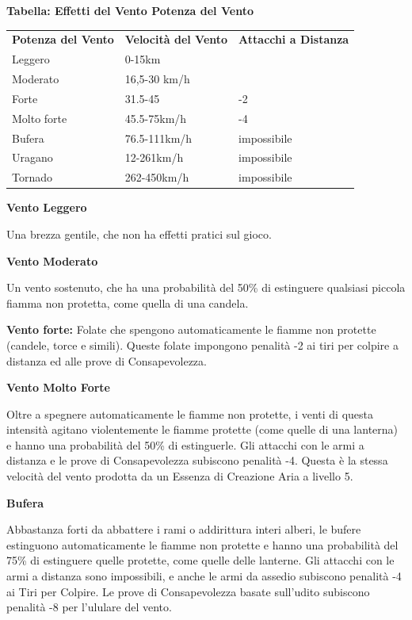 \documentclass[a4paper,11pt,twoside,openany]{book}
\begin{document}
\textbf{Tabella: Effetti del Vento Potenza del Vento}

\medskip

\begin{tabular}{lll}
	\toprule
	\textbf{Potenza del Vento} & \textbf{Velocità del Vento}   & \textbf{Attacchi a Distanza} \\
	Leggero     & 0-15km \\
	Moderato    & 16,5-30 km/h  \\
	Forte       & 31.5-45        & -2 \\
	Molto forte & 45.5-75km/h    & -4 \\
	Bufera      & 76.5-111km/h   & impossibile  \\
	Uragano     & 12-261km/h     & impossibile \\
	Tornado     & 262-450km/h    & impossibile\\
\end{tabular}

\bigskip

\textbf{Vento Leggero}

Una brezza gentile, che non ha effetti pratici sul gioco.

\textbf{Vento Moderato}

Un vento sostenuto, che ha una probabilità del 50\% di estinguere qualsiasi piccola fiamma non protetta, come quella di una candela.

\textbf{Vento forte:} Folate che spengono automaticamente le fiamme non protette (candele, torce e simili). Queste folate impongono penalità -2 ai tiri per colpire a distanza ed alle prove di Consapevolezza.

\textbf{Vento Molto Forte}

Oltre a spegnere automaticamente le fiamme non protette, i venti di questa intensità agitano violentemente le fiamme protette (come quelle di una lanterna) e hanno una probabilità del 50\% di estinguerle. Gli attacchi con le armi a distanza e le prove di Consapevolezza subiscono penalità -4. Questa è la stessa velocità del vento prodotta da un Essenza di Creazione Aria a livello 5.

\textbf{Bufera}

Abbastanza forti da abbattere i rami o addirittura interi alberi, le bufere estinguono automaticamente le fiamme non protette e hanno una probabilità del 75\% di estinguere quelle protette, come quelle delle lanterne. Gli attacchi con le armi a distanza sono impossibili, e anche le armi da assedio subiscono penalità -4 ai Tiri per Colpire. Le prove di Consapevolezza basate sull'udito subiscono penalità -8 per l'ululare del vento.
\end{document}
